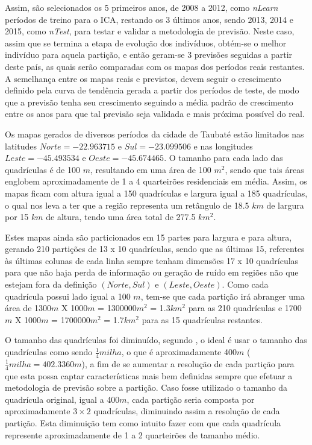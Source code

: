 Assim, são selecionados os 5 primeiros anos, de 2008 a 2012, como \emph{nLearn} períodos de treino para o ICA, restando os 3 últimos anos, sendo 2013, 2014 e 2015, como \emph{nTest}, para testar e validar a metodologia de previsão. Neste caso, assim que se termina a etapa de evolução dos indivíduos, obtém-se o melhor indivíduo para aquela partição, e então geram-se 3 previsões seguidas a partir deste país, as quais serão comparadas com os mapas dos períodos reais restantes. A semelhança entre os mapas reais e previstos, devem seguir o crescimento definido pela curva de tendência gerada a partir dos períodos de teste, de modo que a previsão tenha seu crescimento seguindo a média padrão de crescimento entre os anos para que tal previsão seja validada e mais próxima possível do real.

Os mapas gerados de diversos períodos da cidade de Taubaté estão limitados nas latitudes \(Norte = -22.963715\) e \(Sul = -23.099506\) e nas longitudes \(Leste = -45.493534\) e \(Oeste = -45.674465\). O tamanho para cada lado das quadrículas é de 100 \(m\), resultando em uma área de 100 \(m^2\), sendo que tais áreas englobem aproximadamente de 1 a 4 quarteirões residenciais em média. Assim, os mapas ficam com altura igual a 150 quadrículas e largura igual a 185 quadrículas, o qual nos leva a ter que a região representa um retângulo de 18.5 \(km\) de largura por 15 \(km\) de altura, tendo uma área total de 277.5 \(km^2\). 

Estes mapas ainda são particionados em 15 partes para largura e para altura, gerando 210 partições de 13 x 10 quadrículas, sendo que as últimas 15, referentes às últimas colunas de cada linha sempre tenham dimensões 17 x 10 quadrículas para que não haja perda de informação ou geração de ruído em regiões não que estejam fora da definição \((Norte, Sul)\) e \((Leste, Oeste)\). Como cada quadrícula possui lado igual a 100 \(m\), tem-se que cada partição irá abranger uma área de 1300\(m\) X 1000\(m\) = 1300000\(m^2\) = 1.3\(km^2\) para as 210 quadrículas e 1700\(m\) X 1000\(m\) = 1700000\(m^2\) = 1.7\(km^2\)  para as 15 quadrículas restantes.

O tamanho das quadrículas foi diminuído, segundo \citeauthor{willis2002spatial}, o ideal é usar o tamanho das quadrículas como sendo \(\frac{1}{4} milha\), o que é aproximadamente 400\(m\) (\(\frac{1}{4} milha = 402.3360m\)), a fim de se aumentar a resolução de cada partição para que esta possa captar características mais bem definidas sempre que efetuar a metodologia de previsão sobre a partição. Caso fosse utilizado o tamanho da quadrícula original, igual a 400\(m\), cada partição seria composta por aproximadamente \(3 \times 2\) quadrículas, diminuindo assim a resolução de cada partição. Esta diminuição tem como intuito fazer com que cada quadrícula represente aproximadamente de 1 a 2 quarteirões de tamanho médio.


